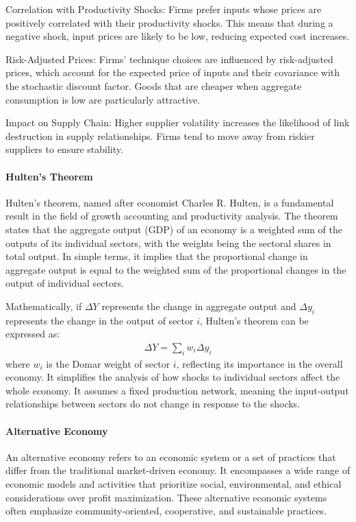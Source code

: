 \documentclass[11pt]{article}
\theoremstyle{definition}
\begin{document}
	Correlation with Productivity Shocks: Firms prefer inputs whose prices are positively correlated with their productivity shocks. This means that during a negative shock, input prices are likely to be low, reducing expected cost increases.
	
	Risk-Adjusted Prices: Firms' technique choices are influenced by risk-adjusted prices, which account for the expected price of inputs and their covariance with the stochastic discount factor. Goods that are cheaper when aggregate consumption is low are particularly attractive.
	
	Impact on Supply Chain: Higher supplier volatility increases the likelihood of link destruction in supply relationships. Firms tend to move away from riskier suppliers to ensure stability.
	
	\paragraph{Hulten's Theorem} Hulten's theorem, named after economist Charles R. Hulten, is a fundamental result in the field of growth accounting and productivity analysis. The theorem states that the aggregate output (GDP) of an economy is a weighted sum of the outputs of its individual sectors, with the weights being the sectoral shares in total output. In simple terms, it implies that the proportional change in aggregate output is equal to the weighted sum of the proportional changes in the output of individual sectors.
	
	Mathematically, if $\Delta Y$ represents the change in aggregate output and $\Delta y_i$ represents the change in the output of sector $i$, Hulten's theorem can be expressed as:
	\begin{align*}
		\Delta Y = \sum\limits_i w_i \Delta y_i
	\end{align*}
	where $w_i$ is the Domar weight of sector $i$, reflecting its importance in the overall economy. It simplifies the analysis of how shocks to individual sectors affect the whole economy. It assumes a fixed production network, meaning the input-output relationships between sectors do not change in response to the shocks.
	
	\paragraph{Alternative Economy} An alternative economy refers to an economic system or a set of practices that differ from the traditional market-driven economy. It encompasses a wide range of economic models and activities that prioritize social, environmental, and ethical considerations over profit maximization. These alternative economic systems often emphasize community-oriented, cooperative, and sustainable practices.
	
\end{document}
